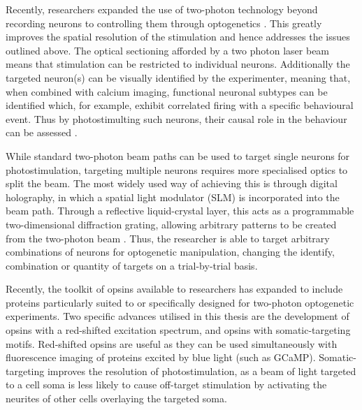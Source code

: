 Recently, researchers expanded the use of two-photon technology beyond recording neurons to controlling them through optogenetics \cite{rickgauer_simultaneous_2014, packer_simultaneous_2015, hernandez_three-dimensional_2016, mardinly_precise_2018, chettih_single-neuron_2019, marshel_cortical_2019, daie_targeted_2021}. This greatly improves the spatial resolution of the stimulation and hence addresses the issues outlined above. The optical sectioning afforded by a two photon laser beam means that stimulation can be restricted to individual neurons. Additionally the targeted neuron(s) can be visually identified by the experimenter, meaning that, when combined with calcium imaging, functional neuronal subtypes can be identified which, for example, exhibit correlated firing with a specific behavioural event. Thus by photostimulting such neurons, their causal role in the behaviour can be assessed \cite{marshel_cortical_2019, daie_targeted_2021, dalgleish_how_2020, russell_influence_2019}.

While standard two-photon beam paths can be used to target single neurons for photostimulation, targeting multiple neurons requires more specialised optics to split the beam. The most widely used way of achieving this is through digital holography, in which a spatial light modulator (SLM) 	is incorporated into the beam path. Through a reflective liquid-crystal layer, this acts as a programmable two-dimensional diffraction grating, allowing arbitrary patterns to be created from the two-photon beam \cite{lutz_holographic_2008}. Thus, the researcher is able to target arbitrary combinations of neurons for optogenetic manipulation, changing the identify, combination or quantity of targets on a trial-by-trial basis. 

Recently, the toolkit of opsins available to researchers has expanded to include proteins particularly suited to \cite{yizhar_neocortical_2011} or specifically designed for \cite{chettih_single-neuron_2019, mardinly_precise_2018, marshel_cortical_2019} two-photon optogenetic experiments. Two specific advances utilised in this thesis are the development of opsins with a red-shifted excitation spectrum, and opsins with somatic-targeting motifs. Red-shifted opsins are useful as they can be used  simultaneously with fluorescence imaging of proteins excited by blue light (such as GCaMP). Somatic-targeting improves the resolution of photostimulation, as a beam of light targeted to a cell soma is less likely to cause off-target stimulation by activating the neurites of other cells overlaying the targeted soma.

